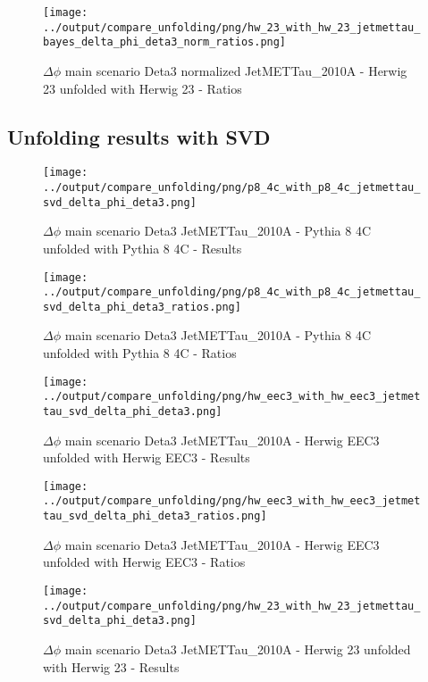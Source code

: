 \documentclass[11pt]{book}
\begin{document}
\begin{figure}[ht]
\centering
\texttt{[image: ../output/compare\_unfolding/png/hw\_23\_with\_hw\_23\_jetmettau\_bayes\_delta\_phi\_deta3\_norm\_ratios.png]}
\caption{$\Delta\phi$ main scenario Deta3 normalized JetMETTau\_2010A - Herwig 23 unfolded with Herwig 23 - Ratios}
\label{hw_23_hw_23_jetmettau_bayes_delta_phi_deta3_norm_b}
\end{figure}


\clearpage
\subsection{Unfolding results with SVD}
\begin{figure}[ht]
\centering
\texttt{[image: ../output/compare\_unfolding/png/p8\_4c\_with\_p8\_4c\_jetmettau\_svd\_delta\_phi\_deta3.png]}
\caption{$\Delta\phi$ main scenario Deta3 JetMETTau\_2010A - Pythia 8 4C unfolded with Pythia 8 4C - Results}
\label{p8_p8_jetmettau_svd_delta_phi_deta3_a}
\end{figure}

\begin{figure}[ht]
\centering
\texttt{[image: ../output/compare\_unfolding/png/p8\_4c\_with\_p8\_4c\_jetmettau\_svd\_delta\_phi\_deta3\_ratios.png]}
\caption{$\Delta\phi$ main scenario Deta3 JetMETTau\_2010A - Pythia 8 4C unfolded with Pythia 8 4C - Ratios}
\label{p8_p8_jetmettau_svd_delta_phi_deta3_b}
\end{figure}

\begin{figure}[ht]
\centering
\texttt{[image: ../output/compare\_unfolding/png/hw\_eec3\_with\_hw\_eec3\_jetmettau\_svd\_delta\_phi\_deta3.png]}
\caption{$\Delta\phi$ main scenario Deta3 JetMETTau\_2010A - Herwig EEC3 unfolded with Herwig EEC3 - Results}
\label{hw_eec3_hw_eec3_jetmettau_svd_delta_phi_deta3_a}
\end{figure}

\begin{figure}[ht]
\centering
\texttt{[image: ../output/compare\_unfolding/png/hw\_eec3\_with\_hw\_eec3\_jetmettau\_svd\_delta\_phi\_deta3\_ratios.png]}
\caption{$\Delta\phi$ main scenario Deta3 JetMETTau\_2010A - Herwig EEC3 unfolded with Herwig EEC3 - Ratios}
\label{hw_eec3_hw_eec3_jetmettau_svd_delta_phi_deta3_b}
\end{figure}

\begin{figure}[ht]
\centering
\texttt{[image: ../output/compare\_unfolding/png/hw\_23\_with\_hw\_23\_jetmettau\_svd\_delta\_phi\_deta3.png]}
\caption{$\Delta\phi$ main scenario Deta3 JetMETTau\_2010A - Herwig 23 unfolded with Herwig 23 - Results}
\label{hw_23_hw_23_jetmettau_svd_delta_phi_deta3_a}
\end{figure}
\end{document}

